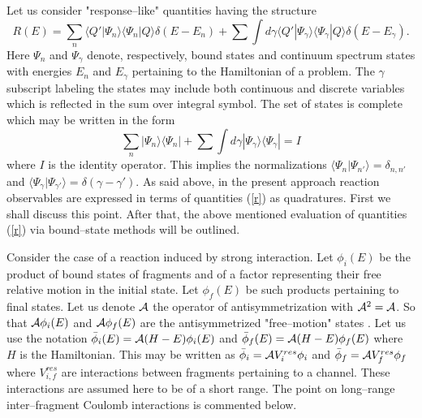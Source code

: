 \documentclass[12pt,ams,preprint,a4paper]{revtex4}
\begin{document}
Let us consider "response--like" quantities 
having the structure  
\begin{equation} R(E)=\sum_n\langle Q'|\Psi_n\rangle\langle\Psi_n|Q\rangle\delta(E-E_n)+
\sum\!\!\!\!\!\!\!\int d\gamma\langle Q'|\Psi_\gamma\rangle\langle
\Psi_\gamma|Q\rangle\delta(E-E_\gamma).\label{r}\end{equation}
Here $\Psi_n$ and $\Psi_\gamma$ denote, respectively, bound states and continuum spectrum states with energies $E_n$ and
$E_\gamma$
pertaining to the Hamiltonian of a problem. 
The $\gamma$ subscript labeling the states may include both continuous and discrete 
variables which is reflected in the sum over integral symbol. The set of states is complete which
may be written in the form
\begin{equation} \sum_n|\Psi_n\rangle\langle\Psi_n|+
\sum\!\!\!\!\!\!\!\int d\gamma|\Psi_\gamma\rangle\langle\Psi_\gamma|=I\label{i}\end{equation}
where $I$ is the identity operator. This implies the 
normalizations \mbox{$\langle\Psi_n|\Psi_{n'}\rangle=\delta_{n,n'}$} and
\mbox{$\langle\Psi_\gamma|\Psi_{\gamma'}\rangle=\delta(\gamma-\gamma')$}. 
As said above, in the present approach
reaction observables are expressed   in terms of quantities (\ref{r}) as quadratures.
First we shall discuss this point. After that,
the above mentioned 
evaluation of quantities (\ref{r}) via bound--state methods will be outlined. 


 Consider the case of a reaction induced by strong interaction.
Let $\phi_{i}(E)$ be the product of bound states of fragments and of a
factor representing their free relative motion in the initial state. Let 
$\phi_{f}(E)$ be such products pertaining to final states. Let us 
denote ${\cal A}$ the operator of antisymmetrization with ${\cal A}^2={\cal A}$. So that  
\mbox{${\cal A}\phi_i(E)$} and \mbox{${\cal A}\phi_f(E)$} are 
the antisymmetrized "free--motion" states \cite{GW}.
Let us use the notation \mbox{${\bar\phi}_i(E)={\cal A}(H-E)\phi_i(E)$} and
\mbox{$ {\bar\phi}_f(E)={\cal A}(H-E)\phi_f(E)$} where $H$ is the Hamiltonian.
This may be written as  \mbox{$\bar\phi_{i}={\cal A}V_{i}^{res}\phi_{i}$} and 
$\bar\phi_{f}={\cal A}V_{f}^{res}\phi_{f}$ where 
$V_{i,f}^{res}$ are interactions between fragments pertaining to a channel.
These interactions are assumed here to be of a short range.
The point on long--range inter--fragment Coulomb interactions
is commented below. 
\end{document}
